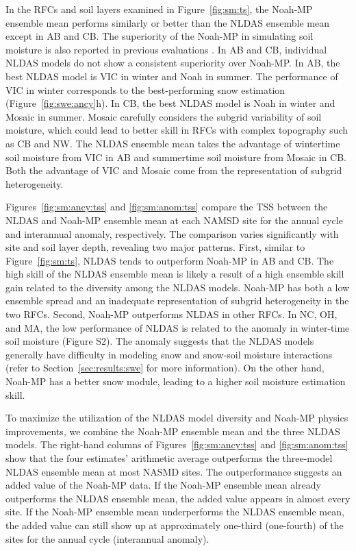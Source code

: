 \documentclass[essd, manuscript]{copernicus}
\begin{document}
In the RFCs and soil layers examined in Figure~\ref{fig:sm:ts}, the Noah-MP ensemble mean performs similarly or better than the NLDAS ensemble mean except in AB and CB\@. The superiority of the Noah-MP in simulating soil moisture is also reported in previous evaluations \citep{cai2014JGRAa}. In AB and CB, individual NLDAS models do not show a consistent superiority over Noah-MP\@. In AB, the best NLDAS model is VIC in winter and Noah in summer. The performance of VIC in winter corresponds to the best-performing snow estimation (Figure~\ref{fig:swe:ancy}h). In CB, the best NLDAS model is Noah in winter and Mosaic in summer. Mosaic carefully considers the subgrid variability of soil moisture, which could lead to better skill in RFCs with complex topography such as CB and NW\@. The NLDAS ensemble mean takes the advantage of wintertime soil moisture from VIC in AB and summertime soil moisture from Mosaic in CB\@. Both the advantage of VIC and Mosaic come from the representation of subgrid heterogeneity.

Figures~\ref{fig:sm:ancy:tss} and \ref{fig:sm:anom:tss} compare the TSS between the NLDAS and Noah-MP ensemble mean at each NAMSD site for the annual cycle and interannual anomaly, respectively. The comparison varies significantly with site and soil layer depth, revealing two major patterns. First, similar to Figure~\ref{fig:sm:ts}, NLDAS tends to outperform Noah-MP in AB and CB\@. The high skill of the NLDAS ensemble mean is likely a result of a high ensemble skill gain \citep{fei2021WRR} related to the diversity among the NLDAS models. Noah-MP has both a low ensemble spread and an inadequate representation of subgrid heterogeneity in the two RFCs. Second, Noah-MP outperforms NLDAS in other RFCs. In NC, OH, and MA, the low performance of NLDAS is related to the anomaly in winter-time soil moisture (Figure S2). The anomaly suggests that the NLDAS models generally have difficulty in modeling snow and snow-soil moisture interactions (refer to Section~\ref{sec:results:swe} for more information). On the other hand, Noah-MP has a better snow module, leading to a higher soil moisture estimation skill.

To maximize the utilization of the NLDAS model diversity and Noah-MP physics improvements, we combine the Noah-MP ensemble mean and the three NLDAS models. The right-hand columns of Figures~\ref{fig:sm:ancy:tss} and \ref{fig:sm:anom:tss} show that the four estimates' arithmetic average outperforms the three-model NLDAS ensemble mean at most NASMD sites. The outperformance suggests an added value of the Noah-MP data. If the Noah-MP ensemble mean already outperforms the NLDAS ensemble mean, the added value appears in almost every site. If the Noah-MP ensemble mean underperforms the NLDAS ensemble mean, the added value can still show up at approximately one-third (one-fourth) of the sites for the annual cycle (interannual anomaly).
\end{document}
